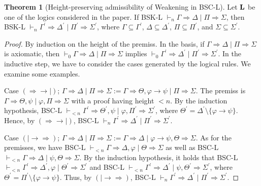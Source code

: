 \documentclass[10pt,a4paper]{article}
\theoremstyle{definition}
\newtheorem{theorem}{\textbf{Theorem}}
\newcommand{\3}{\vspace{.3in}}
\newcommand{\2}{\vspace{.2in}}
\newcommand{\1}{\vspace{.1in}}
\newcommand{\5}{\vspace{.05in}}
\begin{document}
\begin{theorem}[Height-preserving admissibility of Weakening in BSC-L]\label{Weakening}
Let $ \bf L$ be one of the logics considered in the paper. If BSK-L $ \vdash_n \Gamma\Rightarrow\Delta\mid\Pi\Rightarrow\Sigma$, then BSK-L $ \vdash_n \Gamma^\prime\Rightarrow\Delta^\prime\mid\Pi^\prime\Rightarrow\Sigma^\prime$, where $ \Gamma\subseteq\Gamma^\prime $, $ \Delta\subseteq\Delta^\prime $, $ \Pi\subseteq\Pi^\prime $, and $ \Sigma\subseteq\Sigma^\prime $.	
\end{theorem}
\begin{proof}
	By induction on the height of the premiss. In the basis, if $ \Gamma\Rightarrow\Delta\mid\Pi\Rightarrow\Sigma $ is
	axiomatic, then $ \vdash_0\Gamma\Rightarrow\Delta\mid\Pi\Rightarrow\Sigma $ implies $ \vdash_0 \Gamma^\prime\Rightarrow\Delta^\prime\mid\Pi^\prime\Rightarrow\Sigma^\prime$. In the
	inductive step, we have to consider the cases generated by the logical rules. We examine some examples.
	
Case $ (\Rightarrow\rightarrow\mid) $; $ \Gamma\Rightarrow\Delta\mid\Pi\Rightarrow\Sigma:=\Gamma\Rightarrow\Theta,\varphi\rightarrow\psi\mid\Pi\Rightarrow\Sigma $. The premiss is $ \Gamma\Rightarrow\Theta,\psi\mid\varphi,\Pi\Rightarrow\Sigma $ with a proof having height $ < n $. By the induction hypothesis, BSC-L $ \vdash_{<n}\Gamma^\prime\Rightarrow\Theta^\prime,\psi\mid\varphi,\Pi^\prime\Rightarrow\Sigma^\prime $, where $ \Theta^\prime=\Delta^\prime\setminus\{\varphi\rightarrow\psi\} $. Hence, by $ (\Rightarrow\rightarrow\mid) $, BSC-L $ \vdash_{n}\Gamma^\prime\Rightarrow\Delta^\prime\mid\Pi^\prime\Rightarrow\Sigma^\prime $.

Case $ (\mid\rightarrow\Rightarrow) $; $ \Gamma\Rightarrow\Delta\mid\Pi\Rightarrow\Sigma:=\Gamma\Rightarrow\Delta\mid\varphi\rightarrow\psi,\Theta\Rightarrow\Sigma$. As for the premisses, we have BSC-L $ \vdash_{<n}\Gamma\Rightarrow\Delta,\varphi\mid\Theta\Rightarrow\Sigma$ as well as BSC-L  $ \vdash_{<n}\Gamma\Rightarrow\Delta\mid\psi,\Theta\Rightarrow\Sigma$. By the induction hypothesis, it holds that BSC-L $ \vdash_{<n}\Gamma^\prime\Rightarrow\Delta^\prime,\varphi\mid\Theta^\prime\Rightarrow\Sigma^\prime$ and BSC-L  $ \vdash_{<n}\Gamma^\prime\Rightarrow\Delta^\prime\mid\psi,\Theta^\prime\Rightarrow\Sigma^\prime$, where $ \Theta^\prime=\Pi^\prime\setminus\{\varphi\rightarrow\psi\} $. Thus, by $ (\mid\rightarrow\Rightarrow) $, BSC-L $ \vdash_{n}\Gamma^\prime\Rightarrow\Delta^\prime\mid\Pi^\prime\Rightarrow\Sigma^\prime $.
\end{proof}
\end{document}
